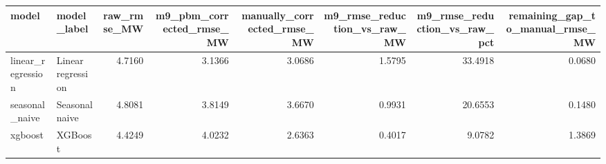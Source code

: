 \begin{tabular}{llrrrrrr}
\toprule
model & model_label & raw_rmse_MW & m9_pbm_corrected_rmse_MW & manually_corrected_rmse_MW & m9_rmse_reduction_vs_raw_MW & m9_rmse_reduction_vs_raw_pct & remaining_gap_to_manual_rmse_MW \\
\midrule
linear_regression & Linear regression & 4.7160 & 3.1366 & 3.0686 & 1.5795 & 33.4918 & 0.0680 \\
seasonal_naive & Seasonal naive & 4.8081 & 3.8149 & 3.6670 & 0.9931 & 20.6553 & 0.1480 \\
xgboost & XGBoost & 4.4249 & 4.0232 & 2.6363 & 0.4017 & 9.0782 & 1.3869 \\
\bottomrule
\end{tabular}
